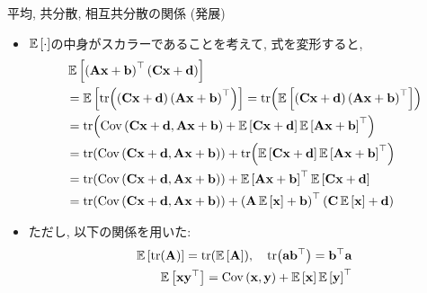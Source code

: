 \documentclass[dvipdfmx,notheorems,t]{beamer}
\begin{document}
\begin{frame}{平均, 共分散, 相互共分散の関係 (発展)}
\begin{itemize}
  \item $\E{\cdot}$の中身がスカラーであることを考えて, 式を変形すると,
  {\small \begin{align*}
    & \E{\left( \vb{A} \vb{x} + \vb{b} \right)^\top \left( \vb{C} \vb{x} + \vb{d} \right)} \\
    &= \E{\tr(\left( \vb{C} \vb{x} + \vb{d} \right) \left( \vb{A} \vb{x} + \vb{b} \right)^\top)}
    = \tr(\E{\left( \vb{C} \vb{x} + \vb{d} \right) \left( \vb{A} \vb{x} + \vb{b} \right)^\top}) \\
    &= \tr(\Cov{\vb{C} \vb{x} + \vb{d}}{\vb{A} \vb{x} + \vb{b}}
      + \E{\vb{C} \vb{x} + \vb{d}} \E{\vb{A} \vb{x} + \vb{b}}^\top) \\
    &= \tr(\Cov{\vb{C} \vb{x} + \vb{d}}{\vb{A} \vb{x} + \vb{b}})
      + \tr(\E{\vb{C} \vb{x} + \vb{d}} \E{\vb{A} \vb{x} + \vb{b}}^\top) \\
    &= \tr(\Cov{\vb{C} \vb{x} + \vb{d}}{\vb{A} \vb{x} + \vb{b}})
      + \E{\vb{A} \vb{x} + \vb{b}}^\top \E{\vb{C} \vb{x} + \vb{d}} \\
    &= \tr(\Cov{\vb{C} \vb{x} + \vb{d}}{\vb{A} \vb{x} + \vb{b}})
      + \left( \vb{A} \E{\vb{x}} + \vb{b} \right)^\top
      \left( \vb{C} \E{\vb{x}} + \vb{d} \right)
  \end{align*}}
  \item ただし, 以下の関係を用いた:
  {\small \begin{align*}
    \E{\tr(\vb{A})} = \tr(\E{\vb{A}}), \quad
    \tr(\vb{a} \vb{b}^\top) = \vb{b}^\top \vb{a} \\
    \E{\vb{x} \vb{y}^\top} = \Cov{\vb{x}}{\vb{y}} + \E{\vb{x}} \E{\vb{y}}^\top
  \end{align*}}
\end{itemize}
\end{frame}
\end{document}
